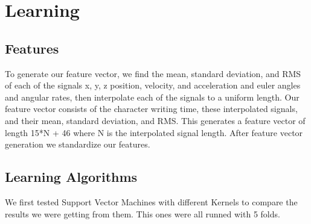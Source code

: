 \documentclass{article}
\begin{document}

\section{Learning}

\subsection{Features}
To generate our feature vector, we find the mean, standard deviation, and RMS of each of the signals x, y, z position, velocity, and acceleration and euler angles and angular rates, then interpolate each of the signals to a uniform length.  Our feature vector consists of the character writing time, these interpolated signals, and their mean, standard deviation, and RMS.  This generates a feature vector of length 15*N + 46 where N is the interpolated signal length.  After feature vector generation we standardize our features.  
 
\subsection{Learning Algorithms}
We first tested Support Vector Machines with different Kernels to compare the results we were getting from them. This ones were all runned with 5 folds.
\end{document}
